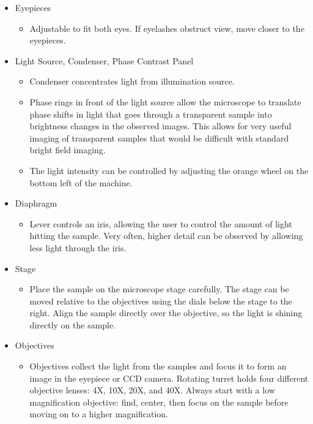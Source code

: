 \begin{itemize}
\itemsep-0.3em
\item Eyepieces
\begin{itemize}
	\itemsep-0.3em
	\item Adjustable to fit both eyes. If eyelashes obstruct view, move closer to the eyepieces.
\end{itemize}
\item Light Source, Condenser, Phase Contrast Panel
\begin{itemize}
	\itemsep-0.3em
	\item Condenser concentrates light from illumination source.
	\item Phase rings in front of the light source allow the microscope to translate phase shifts in light that goes through a transparent sample into brightness changes in the observed images. This allows for very useful imaging of transparent samples that would be difficult with standard bright field imaging.
	\item The light intensity can be controlled by adjusting the orange wheel on the bottom left of the machine.
\end{itemize}
\item Diaphragm
\begin{itemize}
	\itemsep-0.3em
	\item Lever controls an iris, allowing the user to control the amount of light hitting the sample. Very often, higher detail can be observed by allowing less light through the iris.
\end{itemize}
\item Stage
\begin{itemize}
	\itemsep-0.3em
	\item Place the sample on the microscope stage carefully. The stage can be moved relative to the objectives using the dials below the stage to the right. Align the sample directly over the objective, so the light is shining directly on the sample.
\end{itemize}
\item Objectives
\begin{itemize}
	\itemsep-0.3em
	\item Objectives collect the light from the samples and focus it to form an image in the eyepiece or CCD camera. Rotating turret holds four different objective lenses: 4X, 10X, 20X, and 40X. Always start with a low magnification objective: find, center, then focus on the sample before moving on to a higher magnification.

\end{itemize}
\end{itemize}
